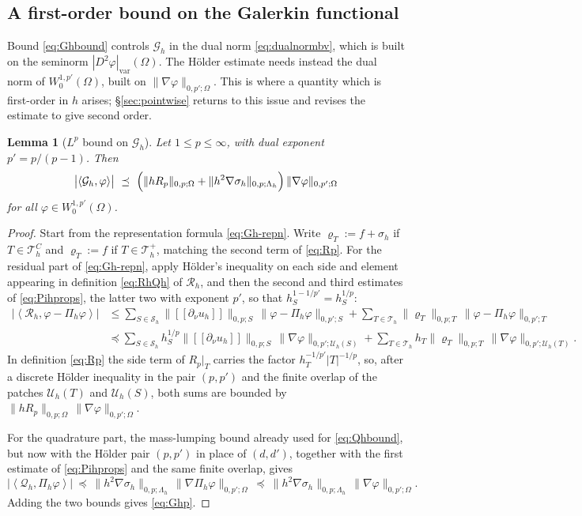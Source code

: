 \documentclass[12pt]{amsart}
\numberwithin{equation}{section}
\theoremstyle{plain}
\newtheorem{lemma}[theorem]{Lemma}
\theoremstyle{definition}
\theoremstyle{remark}
\newcommand{\Om}{\Omega}
\newcommand{\Th}{\mathcal{T}_h}
\newcommand{\Sh}{\mathcal{S}_h}
\newcommand{\Pih}{\Pi_h}
\newcommand{\Uh}{\mathcal{U}_h}
\newcommand{\Thplus}{\Th^+}
\newcommand{\ThC}{\Th^C}
\newcommand{\Gh}{\mathcal{G}_h}
\newcommand{\Rh}{\mathcal{R}_h}
\newcommand{\Qh}{\mathcal{Q}_h}
\newcommand{\jump}[1]{[\![#1]\!]}
\newcommand{\Lamh}{\Lambda_h}
\begin{document}
\subsection{A first-order bound on the Galerkin functional}  Bound \eqref{eq:Ghbound} controls $\Gh$ in the dual norm \eqref{eq:dualnormbv}, which is built on the seminorm $|D^2\varphi|_{\mathrm{var}}(\Om)$.  The H\"older estimate needs instead the dual norm of $W_0^{1,p'}(\Om)$, built on $\|\nabla\varphi\|_{0,p';\Om}$.  This is where a quantity which is first-order in $h$ arises; \S \ref{sec:pointwise} returns to this issue and revises the estimate to give second order.

\begin{lemma}[$L^p$ bound on $\Gh$]
\label{lem:Ghp}
Let $1 \le p \le \infty$, with dual exponent $p' = p/(p-1)$.  Then
\begin{equation}
\label{eq:Ghp}
  \bigl|\left<\Gh,\varphi\right>\bigr| \ \preceq\ \Bigl(\|h R_p\|_{0,p;\Om} + \|h^2\nabla\sigma_h\|_{0,p;\Lamh}\Bigr)\,\|\nabla\varphi\|_{0,p';\Om}
\end{equation}
for all $\varphi \in W_0^{1,p'}(\Om)$.
\end{lemma}

\begin{proof}
Start from the representation formula \eqref{eq:Gh-repn}.  Write $\varrho_T := f + \sigma_h$ if $T\in\ThC$ and $\varrho_T := f$ if $T\in\Thplus$, matching the second term of \eqref{eq:Rp}.  For the residual part of \eqref{eq:Gh-repn}, apply H\"older's inequality on each side and element appearing in definition \eqref{eq:RhQh} of $\Rh$, and then the second and third estimates of \eqref{eq:Pihprops}, the latter two with exponent $p'$, so that $h_S^{1-1/p'} = h_S^{1/p}$:
\begin{align*}
  \bigl|\left<\Rh,\varphi-\Pih\varphi\right>\bigr|
  &\le \sum_{S\in\Sh} \bigl\|\jump{\partial_\nu u_h}\bigr\|_{0,p;S}\,\|\varphi-\Pih\varphi\|_{0,p';S}
     + \sum_{T\in\Th} \|\varrho_T\|_{0,p;T}\,\|\varphi-\Pih\varphi\|_{0,p';T} \\
  &\preceq \sum_{S\in\Sh} h_S^{1/p}\bigl\|\jump{\partial_\nu u_h}\bigr\|_{0,p;S}\,\|\nabla\varphi\|_{0,p';\Uh(S)}
     + \sum_{T\in\Th} h_T\|\varrho_T\|_{0,p;T}\,\|\nabla\varphi\|_{0,p';\Uh(T)}.
\end{align*}
In definition \eqref{eq:Rp} the side term of $R_p|_T$ carries the factor $h_T^{-1/p'}|T|^{-1/p}$, so, after a discrete H\"older inequality in the pair $(p,p')$ and the finite overlap of the patches $\Uh(T)$ and $\Uh(S)$, both sums are bounded by $\|hR_p\|_{0,p;\Om}\,\|\nabla\varphi\|_{0,p';\Om}$.

For the quadrature part, the mass-lumping bound already used for \eqref{eq:Qhbound}, but now with the H\"older pair $(p,p')$ in place of $(d,d')$, together with the first estimate of \eqref{eq:Pihprops} and the same finite overlap, gives
\[
  \bigl|\left<\Qh,\Pih\varphi\right>\bigr| \ \preceq\ \|h^2\nabla\sigma_h\|_{0,p;\Lamh}\,\|\nabla\Pih\varphi\|_{0,p';\Om}
  \ \preceq\ \|h^2\nabla\sigma_h\|_{0,p;\Lamh}\,\|\nabla\varphi\|_{0,p';\Om}.
\]
Adding the two bounds gives \eqref{eq:Ghp}.
\end{proof}
\end{document}
